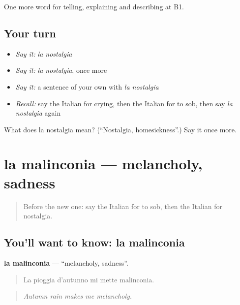 \begin{grammarlens}[title={What you've built}]
One more word for telling, explaining and describing at B1.
\end{grammarlens}

\subsection*{Your turn}
\begin{itemize}
\raggedright
  \item \emph{Say it:} \emph{la nostalgia}
  \item \emph{Say it:} \emph{la nostalgia}, once more
  \item \emph{Say it:} a sentence of your own with \emph{la nostalgia}
  \item \emph{Recall:} say the Italian for crying, then the Italian for to sob, then say \emph{la nostalgia} again
\end{itemize}

\begin{tcolorbox}[breakable,colback=teal!4,colframe=teal!35!black,title={Before you move on}]
What does la nostalgia mean? (\textquotedblleft{}Nostalgia, homesickness\textquotedblright{}.) Say it once more.
\end{tcolorbox}
\section[la malinconia]{la malinconia — melancholy, sadness}

\label{lesson:IT-C477-malinconia}



\begin{quote}
Before the new one: say the Italian for to sob, then the Italian for nostalgia.
\end{quote}

\subsection*{You'll want to know: la malinconia}
\textbf{la malinconia} — \textquotedblleft{}melancholy, sadness\textquotedblright{}.

\begin{quote}
La pioggia d'autunno mi mette malinconia.
\end{quote}

\begin{quote}
\emph{Autumn rain makes me melancholy.}
\end{quote}

